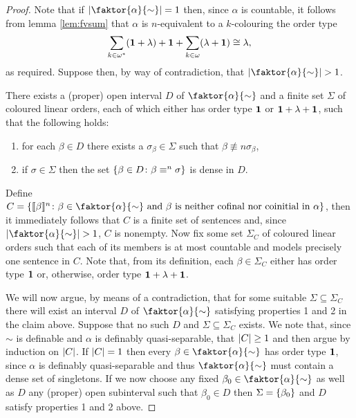 \begin{proof}
	Note that if $\card{\faktor{\alpha}{\sim}}=1$ then, since $\alpha$ is countable, it follows from lemma \ref{lem:fvsum} that $\alpha$ is $n$-equivalent to a $k$-colouring the order type
	\begin{equation}
		\sum_{k\in{\omega}^\ast}(\mathbf{1}+\lambda)+\mathbf{1}+\sum_{k\in\omega}(\lambda+\mathbf{1})\cong\lambda,
	\end{equation}
	as required.  Suppose then, by way of contradiction, that $\card{\faktor{\alpha}{\sim}}>1$.
	\begin{claim}
		There exists a (proper) open interval $D$ of $\faktor{\alpha}{\sim}$ and a finite set $\Sigma$ of coloured linear orders, each of which either has order type $\mathbf{1}$ or $\mathbf{1}+\lambda+\mathbf{1}$, such that the following holds:
		\begin{enumerate}[nosep]
			\item for each $\beta\in D$ there exists a $\sigma_\beta\in\Sigma$  such that $\beta\nequiv{n}\sigma_\beta$,

			\item if $\sigma\in\Sigma$ then the set $\left\lbrace \beta\in D\colon \beta\equiv^{n}\sigma \right\rbrace$ is dense in $D$.
		\end{enumerate}
	\end{claim}

	Define $C=\setbuild{\cha{\beta}{n}}{\beta\in\faktor{\alpha}{\sim}\text{ and }\beta\text{ is neither cofinal nor coinitial in }\alpha}$, then it immediately follows that $C$ is a finite set of sentences and, since $\card{\faktor{\alpha}{\sim}}>1$, $C$ is nonempty.  Now fix some set $\Sigma_C$ of coloured linear orders such that each of its members is at most countable and models precisely one sentence in $C$.  Note that, from its definition, each $\beta\in\Sigma_C$ either has order type $\mathbf{1}$ or, otherwise, order type $\mathbf{1}+\lambda+\mathbf{1}$.

	We will now argue, by means of a contradiction, that for some suitable $\Sigma\subseteq\Sigma_C$ there will exist an interval $D$ of $\faktor{\alpha}{\sim}$ satisfying properties 1 and 2 in the claim above.  Suppose that no such $D$ and $\Sigma\subseteq\Sigma_C$ exists.  We note that, since $\sim$ is definable and $\alpha$ is definably quasi-separable, that $\left\lvert C\right\rvert\geq 1$ and then argue by induction on $\left\lvert C\right\rvert$.  If $\left\lvert C\right\rvert=1$ then every $\beta\in\faktor{\alpha}{\sim}$ has order type $\mathbf{1}$, since $\alpha$ is definably quasi-separable and thus $\faktor{\alpha}{\sim}$ must contain a dense set of singletons.  If we now choose any fixed $\beta_0\in\faktor{\alpha}{\sim}$ as well as $D$ any (proper) open subinterval such that $\beta_0\in D$ then $\Sigma=\left\lbrace \beta_0\right\rbrace$ and $D$ satisfy properties 1 and 2 above.


\end{proof}
